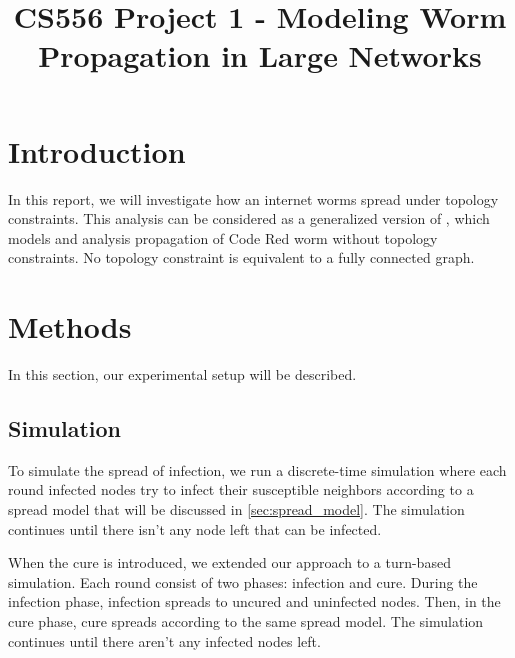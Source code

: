 \documentclass[conference]{IEEEtran}
\begin{document}
\title{CS556 Project 1 - Modeling Worm Propagation in Large Networks\\
}

\author{
}

\maketitle



\section{Introduction}

In this report, we will investigate how an internet worms spread under topology constraints. This analysis can be considered as a generalized version of \cite{redcode}, which models and analysis propagation of Code Red worm without topology constraints. No topology constraint is equivalent to a fully connected graph.

\section{Methods}

In this section, our experimental setup will be described.

\subsection{Simulation}

To simulate the spread of infection, we run a discrete-time simulation where each round infected nodes try to infect their susceptible neighbors according to a spread model that will be discussed in \autoref{sec:spread_model}. The simulation continues until there isn't any node left that can be infected.

When the cure is introduced, we extended our approach to a turn-based simulation. Each round consist of two phases: infection and cure. During the infection phase, infection spreads to uncured and uninfected nodes. Then, in the cure phase, cure spreads according to the same spread model. The simulation continues until there aren't any infected nodes left.
\end{document}
